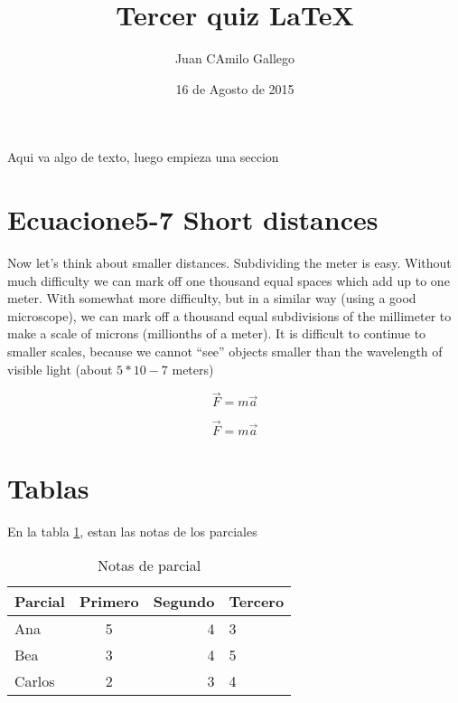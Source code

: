 \documentclass[12pt]{article}
\author{Juan CAmilo Gallego}
\date{16 de Agosto de 2015}
\title{Tercer quiz \LaTeX}
\begin{document}
\maketitle


Aqui va algo de texto, luego empieza una seccion

\section{Ecuacione5-7 Short distances}

Now let’s think about smaller distances. Subdividing the meter is easy. Without much difficulty we can mark off one thousand equal spaces which add up to one meter. With somewhat more difficulty, but in a similar way (using a good microscope), we can mark off a thousand equal subdivisions of the millimeter to make a scale of microns (millionths of a meter). It is difficult to continue to smaller scales, because we cannot “see” objects smaller than the wavelength of visible light (about $5*10-7$ meters)



\begin{equation}
\vec{F}=m\vec{a}
\end{equation}

\begin{equation*}
\vec{F}=m\vec{a}
\end{equation*}

\section{Tablas}

En la tabla \ref{Ta:Notas}, estan las notas de los parciales
\begin{table}[ht]
\centering
\begin{tabular}{| l | c | r | l |}
\hline
Parcial & 
Primero & 
Segundo & 
Tercero \\ \hline
Ana & 5 & 4 & 3 \\ \hline
Bea & 3 & 4 & 5 \\ \hline
Carlos & 2 & 3 & 4 \\ \hline
\end{tabular}
\caption{Notas de parcial}\label{Ta:Notas}
\end{table}




\end{document}
